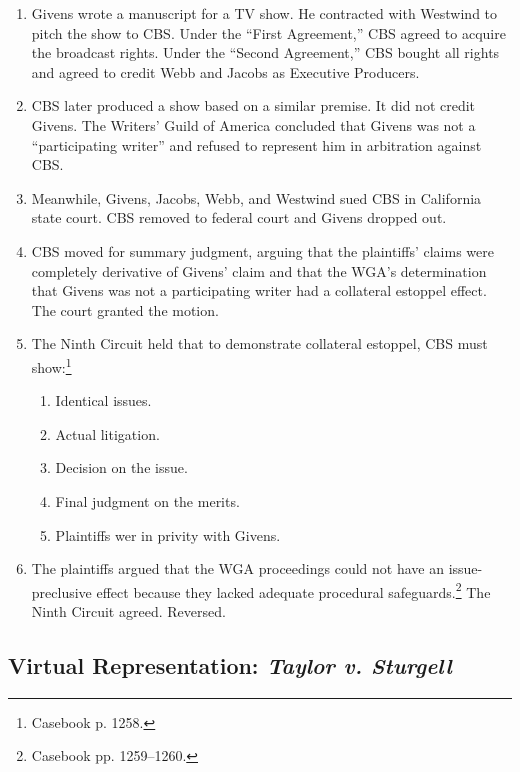 \begin{enumerate}
    \item Givens wrote a manuscript for a TV show. He contracted with 
    Westwind to pitch the show to CBS. Under the ``First Agreement,'' CBS 
    agreed to acquire the broadcast rights. Under the ``Second Agreement,'' 
    CBS bought all rights and agreed to credit Webb and Jacobs as Executive 
    Producers.
    \item CBS later produced a show based on a similar premise. It did not 
    credit Givens. The Writers' Guild of America concluded that Givens was not 
    a ``participating writer'' and refused to represent him in arbitration 
    against CBS.
    \item Meanwhile, Givens, Jacobs, Webb, and Westwind sued CBS in California state 
    court. CBS removed to federal court and Givens dropped out.
    \item CBS moved for summary judgment, arguing that the plaintiffs' claims 
    were completely derivative of Givens' claim and that the WGA's 
    determination that Givens was not a participating writer had a collateral 
    estoppel effect. The court granted the motion.
    \item The Ninth Circuit held that to demonstrate collateral estoppel, CBS 
    must show:\footnote{Casebook p. 1258.}
    \begin{enumerate}
        \item Identical issues.
        \item Actual litigation.
        \item Decision on the issue.
        \item Final judgment on the merits.
        \item Plaintiffs wer in privity with Givens.
    \end{enumerate}
    \item The plaintiffs argued that the WGA proceedings could not have an 
    issue-preclusive effect because they lacked adequate procedural 
    safeguards.\footnote{Casebook pp. 1259--1260.} The Ninth Circuit agreed. 
    Reversed.
\end{enumerate}

\subsection{Virtual Representation: \emph{Taylor v. Sturgell}}


